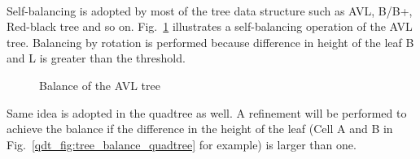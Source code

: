 \paragraph{}
Self-balancing is adopted by most of the tree data structure such as AVL, B/B+, Red-black tree and so on.
Fig.~\ref{qdt_fig:tree_balance_avl} illustrates a self-balancing operation of the AVL tree.
Balancing by rotation is performed because difference in height of the leaf B and L is greater than the threshold.
    \begin{figure}
        \centering
        \caption{Balance of the AVL tree \citep{Roura2013}}
        \label{qdt_fig:tree_balance_avl}
    \end{figure}
Same idea is adopted in the quadtree as well.
A refinement will be performed to achieve the balance if the difference in the height of the leaf (Cell A and B in Fig.~\ref{qdt_fig:tree_balance_quadtree} for example) is larger than one.
